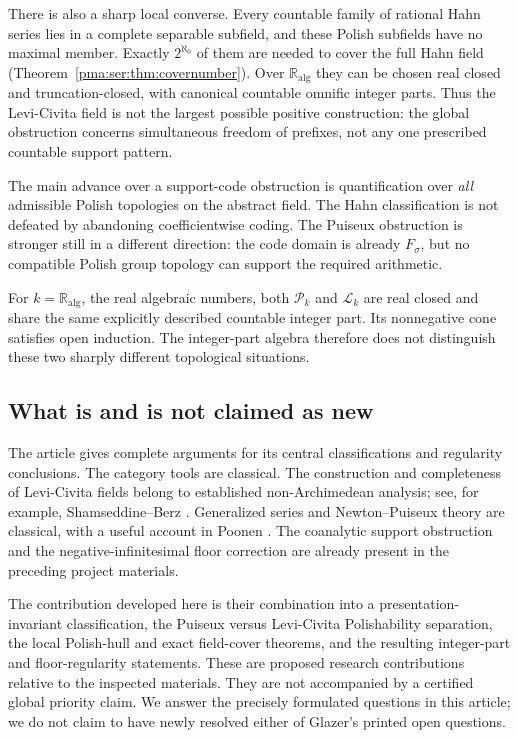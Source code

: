 \documentclass[11pt]{article}
\numberwithin{equation}{section}
\theoremstyle{definition}
\theoremstyle{remark}
\newcommand{\ka}{\mathbb R_{\mathrm{alg}}}
\newcommand{\Pk}{\mathcal P_k}
\newcommand{\Lk}{\mathcal L_k}
\begin{document}
There is also a sharp local converse. Every countable family of rational
Hahn series lies in a complete separable subfield, and these Polish subfields
have no maximal member. Exactly $2^{\aleph_0}$ of them are needed to cover
the full Hahn field (Theorem~\ref{pma:ser:thm:covernumber}). Over $\ka$ they can be
chosen real closed and truncation-closed, with canonical countable omnific
integer parts. Thus the Levi-Civita field is not the largest possible positive
construction: the global obstruction concerns simultaneous freedom of
prefixes, not any one prescribed countable support pattern.

The main advance over a support-code obstruction is quantification over
\emph{all} admissible Polish topologies on the abstract field. The Hahn
classification is not defeated by abandoning coefficientwise coding. The
Puiseux obstruction is stronger still in a different direction: the code
domain is already $F_\sigma$, but no compatible Polish group topology can
support the required arithmetic.

For $k=\ka$, the real algebraic numbers, both $\Pk$ and $\Lk$ are real closed
and share the same explicitly described countable integer part. Its
nonnegative cone satisfies open induction. The integer-part algebra therefore
does not distinguish these two sharply different topological situations.

\subsection{What is and is not claimed as new}

The article gives complete arguments for its central classifications and
regularity conclusions. The category tools are classical. The construction
and completeness of Levi-Civita fields belong to established non-Archimedean
analysis; see, for example, Shamseddine--Berz \cite{SB}. Generalized series and
Newton--Puiseux theory are classical, with a useful account in Poonen
\cite{Poonen}. The coanalytic support obstruction and the negative-infinitesimal
floor correction are already present in the preceding project materials.

The contribution developed here is their combination into a
presentation-invariant classification, the Puiseux versus Levi-Civita
Polishability separation, the local Polish-hull and exact field-cover theorems, and the resulting
integer-part and floor-regularity statements. These are proposed research contributions relative to the inspected
materials. They are not accompanied by a certified global priority claim.
We answer the precisely formulated questions in this article; we do not claim
to have newly resolved either of Glazer's printed open questions.
\end{document}
